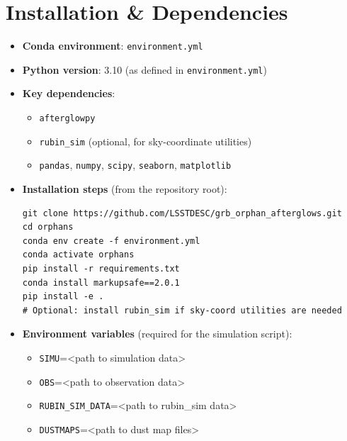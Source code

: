 \documentclass{article}
\begin{document}
\section*{Installation \& Dependencies}
\begin{itemize}
  \item \textbf{Conda environment}: \texttt{environment.yml}
  \item \textbf{Python version}: 3.10 (as defined in \texttt{environment.yml})
  \item \textbf{Key dependencies}:
    \begin{itemize}
      \item \texttt{afterglowpy}
      \item \texttt{rubin\_sim} (optional, for sky-coordinate utilities)
      \item \texttt{pandas}, \texttt{numpy}, \texttt{scipy}, \texttt{seaborn}, \texttt{matplotlib}
    \end{itemize}
  \item \textbf{Installation steps} (from the repository root):
\begin{verbatim}
git clone https://github.com/LSSTDESC/grb_orphan_afterglows.git 
cd orphans
conda env create -f environment.yml
conda activate orphans
pip install -r requirements.txt
conda install markupsafe==2.0.1
pip install -e .
# Optional: install rubin_sim if sky‑coord utilities are needed
\end{verbatim}
  \item \textbf{Environment variables} (required for the simulation script):
    \begin{itemize}
      \item \texttt{SIMU}=<path to simulation data>
      \item \texttt{OBS}=<path to observation data>
      \item \texttt{RUBIN\_SIM\_DATA}=<path to rubin\_sim data>
      \item \texttt{DUSTMAPS}=<path to dust map files>
    \end{itemize}
\end{itemize}
\end{document}
